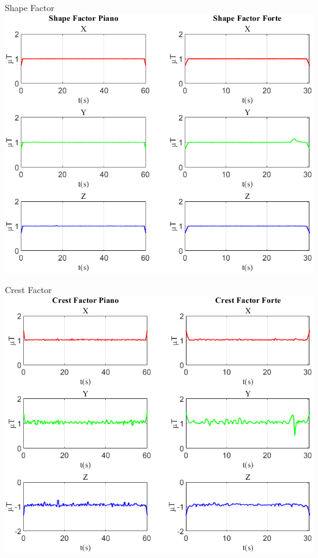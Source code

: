 	\begin{frame}{{Shape Factor}}
		\centering\includegraphics[height=.8\textheight]{figure/Mag/Shape Factor}
	\end{frame}
	
	\begin{frame}{{Crest Factor}}
		\centering\includegraphics[height=.8\textheight]{figure/Mag/Crest Factor}
	\end{frame}
	
